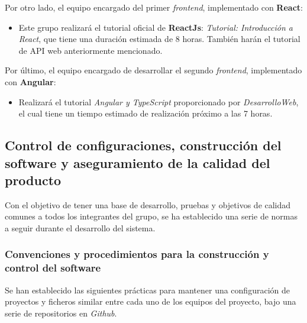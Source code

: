 \documentclass[11pt, a4paper, titlepage]{article}
\begin{document}
Por otro lado, el equipo encargado del primer \textit{frontend}, implementado con \textbf{React}: 

\begin{itemize}

\item  Este grupo realizará el tutorial oficial de \textbf{ReactJs}: \textit{Tutorial: Introducción a React}\cite{reactjs}, que tiene una duración estimada de 8 horas. También harán el tutorial de API web anteriormente mencionado\cite{apisweb}.

\end{itemize}

Por último, el equipo encargado de desarrollar el segundo \textit{frontend}, implementado con \textbf{Angular}: 

\begin{itemize}

\item Realizará el tutorial \textit{Angular y TypeScript}\cite{angular} proporcionado por \textit{DesarrolloWeb}, el cual tiene un tiempo estimado de realización próximo a las 7 horas.

\end{itemize}


\subsection{Control de configuraciones, construcción del software y aseguramiento de la calidad del producto}

Con el objetivo de tener una base de desarrollo, pruebas y objetivos de calidad comunes a todos los integrantes del grupo, se ha establecido una serie de normas a seguir durante el desarrollo del sistema. 



\subsubsection{Convenciones y procedimientos para la construcción y control del software}

Se han establecido las siguientes prácticas para mantener una configuración de proyectos y ficheros similar entre cada uno de los equipos del proyecto, bajo una serie de repositorios en \textit{Github}.
\end{document}
